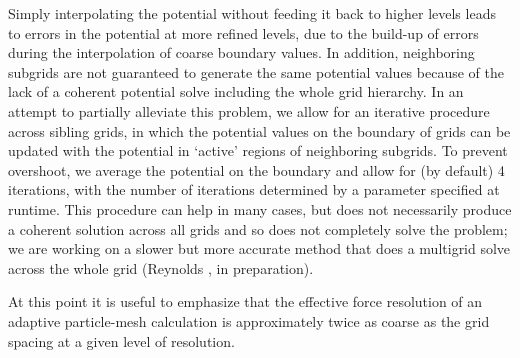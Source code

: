 Simply interpolating the potential without feeding it back to higher
levels leads to errors in the potential at more refined levels, due to
the build-up of errors during the interpolation of coarse boundary
values.  In addition, neighboring subgrids are not guaranteed to
generate the same potential values because of the lack of a coherent
potential solve including the whole grid hierarchy.  In an attempt to
partially alleviate this problem, we allow for an iterative procedure
across sibling grids, in which the potential values on the boundary of
grids can be updated with the potential in `active' regions of
neighboring subgrids.  To prevent overshoot, we average the potential
on the boundary and allow for (by default) 4 iterations, with the
number of iterations determined by a parameter specified at runtime.
This procedure can help in many cases, but does not necessarily
produce a coherent solution across all grids and so does not
completely solve the problem; we are working on a slower but more
accurate method that does a multigrid solve across the whole grid
(Reynolds \etal, in preparation).

At this point it is useful to emphasize that the effective force
resolution of an adaptive particle-mesh calculation is approximately
twice as coarse as the grid spacing at a given level of resolution.
